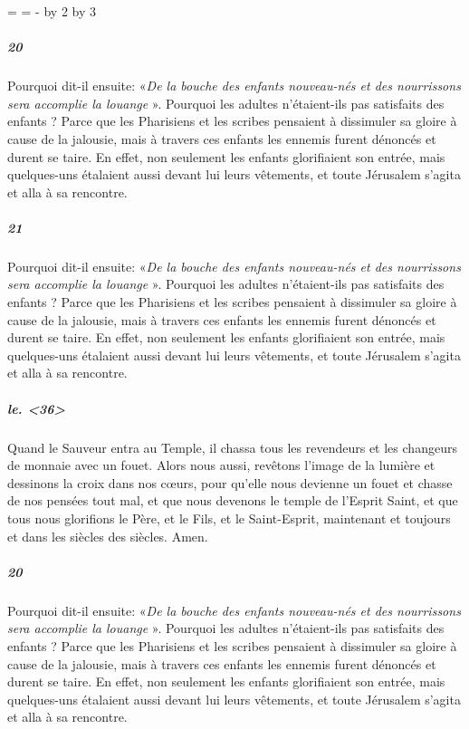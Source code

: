 \documentclass[a4paper]{article}
\newcommand{\largeurunecolonne}{%
  \newdimen\temp
  \temp=\hsize
  \hsize=\Lcolwidth
  \advance\hsize\Rcolwidth
  \advance\temp-\hsize
  \multiply\temp by 2
  \divide\temp by 3
  \advance\hsize\temp
  \renewcommand{\ledrlfill}{\hfill}
}
\begin{document}
    \resumenumbering
    \largeurunecolonne

 


            \pstart
\subparagraph{20}\sloppy
Pourquoi dit-il ensuite: «\textit{De la bouche des enfants nouveau-nés et des nourrissons sera accomplie la louange}%
». Pourquoi les adultes n'étaient-ils pas satisfaits des enfants ? Parce que les Pharisiens et les scribes pensaient à dissimuler sa gloire à cause de la jalousie, mais à travers ces enfants les ennemis furent dénoncés et durent se taire. En effet, non seulement les enfants glorifiaient son entrée, mais quelques-uns étalaient aussi devant lui leurs vêtements, et toute Jérusalem s'agita et alla à sa rencontre.  
        \pend
    \pausenumbering

\begin{pairs}
\begin{Leftside} 
    \resumenumbering
    
    \pstart
\subparagraph{21}\sloppy
Pourquoi dit-il ensuite: «\textit{De la bouche des enfants nouveau-nés et des nourrissons sera accomplie la louange}%
». Pourquoi les adultes n'étaient-ils pas satisfaits des enfants ? Parce que les Pharisiens et les scribes pensaient à dissimuler sa gloire à cause de la jalousie, mais à travers ces enfants les ennemis furent dénoncés et durent se taire. En effet, non seulement les enfants glorifiaient son entrée, mais quelques-uns étalaient aussi devant lui leurs vêtements, et toute Jérusalem s'agita et alla à sa rencontre.  
        \pend

        \endnumbering

\end{Leftside}

\begin{Rightside} 
    \resumenumbering
     
               
        \pstart
        \subparagraph{le. <36>}\sloppy
Quand le Sauveur entra au Temple, il chassa tous les revendeurs et les changeurs de monnaie avec un fouet. Alors nous aussi, revêtons l'image de la lumière et dessinons la croix dans nos cœurs, pour qu'elle nous devienne un fouet et chasse de nos pensées tout mal, et que nous devenons le temple de l'Esprit Saint, et que tous nous glorifions le Père, et le Fils, et le Saint-Esprit, maintenant et toujours et dans les siècles des siècles. Amen. 
        \pend
        
\endnumbering
\end{Rightside}
\Columns

\beginnumbering

 


            \pstart
\subparagraph{20}\sloppy
Pourquoi dit-il ensuite: «\textit{De la bouche des enfants nouveau-nés et des nourrissons sera accomplie la louange}%
». Pourquoi les adultes n'étaient-ils pas satisfaits des enfants ? Parce que les Pharisiens et les scribes pensaient à dissimuler sa gloire à cause de la jalousie, mais à travers ces enfants les ennemis furent dénoncés et durent se taire. En effet, non seulement les enfants glorifiaient son entrée, mais quelques-uns étalaient aussi devant lui leurs vêtements, et toute Jérusalem s'agita et alla à sa rencontre.  
        \pend
    \endnumbering
\end{pairs}
\end{document}
